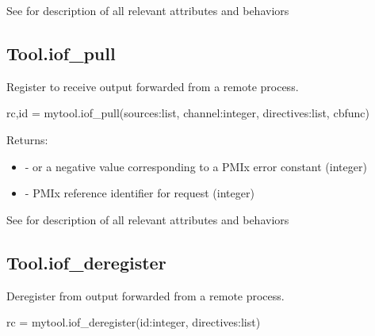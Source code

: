 See  for description of all relevant attributes and behaviors


\subsection{Tool.iof_pull}

\summary

Register to receive output forwarded from a remote process.

\format

\pyspecificstart
\begin{codepar}
rc,id = mytool.iof_pull(sources:list, channel:integer, directives:list, cbfunc)
\end{codepar}
\pyspecificend

\begin{arglist}
\end{arglist}

Returns:

\begin{itemize}
    \item {} -  or a negative value corresponding to a PMIx error constant (integer)
    \item {} - \ac{PMIx} reference identifier for request (integer)
\end{itemize}


See  for description of all relevant attributes and behaviors


\subsection{Tool.iof_deregister}

\summary

Deregister from output forwarded from a remote process.

\format

\pyspecificstart
\begin{codepar}
rc = mytool.iof_deregister(id:integer, directives:list)
\end{codepar}
\pyspecificend

